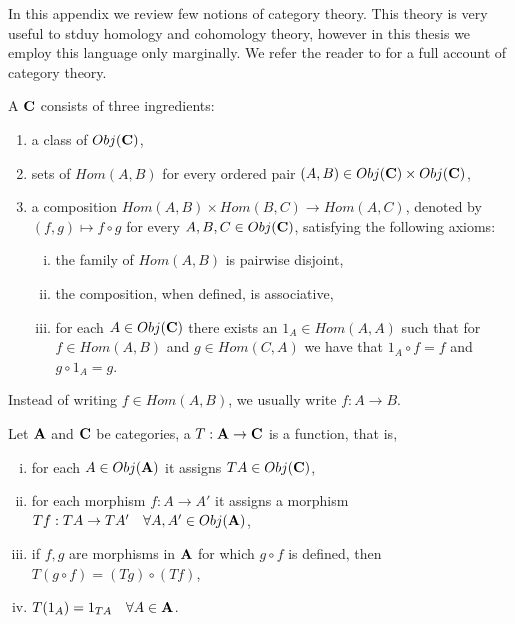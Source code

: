 \documentclass[../1.tex]{subfiles}
\begin{document}
    In this appendix we review few notions of category theory.
    This theory is very useful to stduy homology and cohomology theory, however in this thesis we employ this language only marginally.
    We refer the reader to \cite{mclane} for a full account of category theory.

    \begin{defn}
        A  $\textbf{C}$ consists of three ingredients:
        \begin{enumerate}[1.]
            \item a class of  $Obj(\textbf{C})$,
            \item sets of  $Hom(A,B)$ for every ordered pair $(A,B) \in Obj(\textbf{C}) \times Obj(\textbf{C})$,
            \item a composition $Hom(A,B) \times Hom(B,C) \to Hom(A,C)$, denoted by $(f,g) \mapsto f \circ g$ for every $A,B,C \in Obj(\textbf{C})$, satisfying the following axioms:
            \begin{enumerate}[(i)]
                \item the family of $Hom(A,B)$ is pairwise disjoint,
                \item the composition, when defined, is associative,
                \item for each $A \in Obj(\textbf{C})$ there exists an  $1_A \in Hom(A,A)$ such that for $f \in Hom(A,B)$ and $g \in Hom(C,A)$ we have that $1_A \circ f = f$ and $g \circ 1_A = g$.
            \end{enumerate}
        \end{enumerate}
    \end{defn}

    Instead of writing $f \in Hom(A,B)$, we usually write $f : A \to B$. 

    \begin{defn}
        Let $\textbf{A}$ and $\textbf{C}$ be categories, a  $T : \textbf{A} \to \textbf{C}$ is a function, that is, 
        \begin{enumerate}[(i)]
            \item for each $A \in Obj(\textbf{A})$ it assigns $TA \in Obj(\textbf{C})$,
            \item for each morphism $f:A \to A'$ it assigns a morphism $Tf: TA \to TA' \quad \forall A,A' \in Obj(\textbf{A})$,
            \item if $f,g$ are morphisms in $\textbf{A}$ for which $g \circ f$ is defined, then $T(g \circ f) = (Tg) \circ (Tf)$,
            \item $T(1_A)= 1_{TA} \quad \forall A \in \textbf{A}$.
        \end{enumerate}
    \end{defn}
\end{document}
